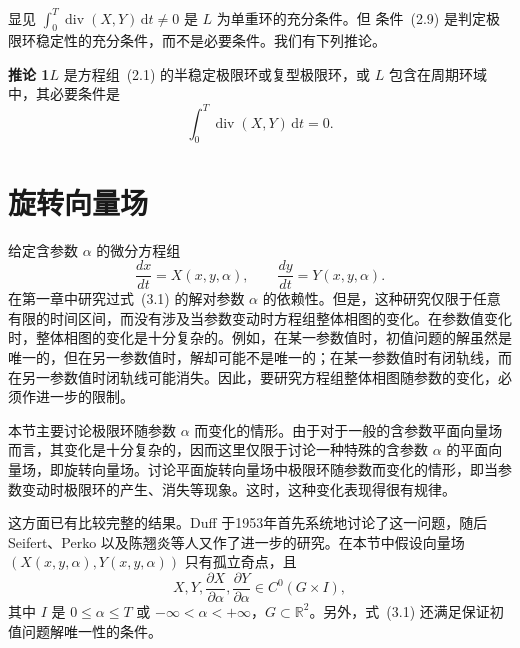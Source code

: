 显见 $\int_0^T\operatorname{div}(X,Y)\,\mathrm{d}t\ne0$ 是 $L$ 为单重环的充分条件。但
条件~(2.9) 是判定极限环稳定性的充分条件，而不是必要条件。我们有下列推论。

\noindent\textbf{推论 1}\quad $L$ 是方程组~(2.1) 的半稳定极限环或复型极限环，或 $L$
包含在周期环域中，其必要条件是
\[
  \int_0^T\operatorname{div}(X,Y)\,\mathrm{d}t=0. \tag{2.10}
\]

\section{旋转向量场}

给定含参数 $\alpha$ 的微分方程组
\[
  \dfrac{dx}{dt}=X(x,y,\alpha),\qquad
  \dfrac{dy}{dt}=Y(x,y,\alpha). \tag{3.1}
\]
在第一章中研究过式~(3.1) 的解对参数 $\alpha$ 的依赖性。但是，这种研究仅限于任意有限的时间区间，而没有涉及当参数变动时方程组整体相图的变化。在参数值变化时，整体相图的变化是十分复杂的。例如，在某一参数值时，初值问题的解虽然是唯一的，但在另一参数值时，解却可能不是唯一的；在某一参数值时有闭轨线，而在另一参数值时闭轨线可能消失。因此，要研究方程组整体相图随参数的变化，必须作进一步的限制。

本节主要讨论极限环随参数 $\alpha$ 而变化的情形。由于对于一般的含参数平面向量场而言，其变化是十分复杂的，因而这里仅限于讨论一种特殊的含参数 $\alpha$ 的平面向量场，即旋转向量场。讨论平面旋转向量场中极限环随参数而变化的情形，即当参数变动时极限环的产生、消失等现象。这时，这种变化表现得很有规律。

这方面已有比较完整的结果。Duff 于1953年首先系统地讨论了这一问题，随后 Seifert、Perko 以及陈翘炎等人又作了进一步的研究。在本节中假设向量场 $(X(x,y,\alpha),Y(x,y,\alpha))$ 只有孤立奇点，且
\[
 X,Y,\dfrac{\partial X}{\partial\alpha},\dfrac{\partial Y}{\partial\alpha}
 \in C^0(G\times I),
\]
其中 $I$ 是 $0\leq\alpha\leq T$ 或 $-\infty<\alpha<+\infty$，$G\subset\mathbb{R}^2$。另外，式~(3.1) 还满足保证初值问题解唯一性的条件。

